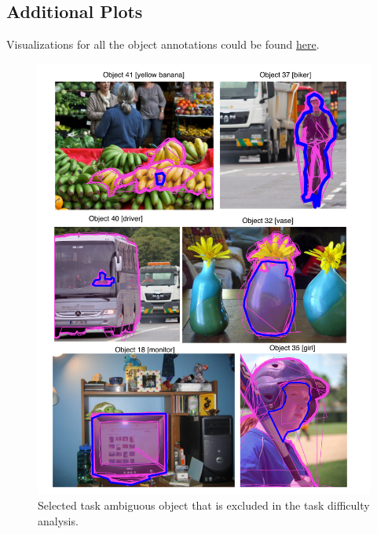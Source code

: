 \documentclass[12pt]{article}
\begin{document}
\begin{appendices}
\section{Additional Plots}
Visualizations for all the object annotations could be found \href{http://nbviewer.jupyter.org/github/dorisjlee/crowd-seg/blob/master/analysis/2017_01_16_Visualize_all_bb_results.ipynb}{here}.
\begin{figure}[ht!]
\centering
\includegraphics[width=\linewidth]{plots/task_ambiguous_cases.pdf}
\caption{Selected task ambiguous object that is excluded in the task difficulty analysis. }
\end{figure}
\begin{figure}[ht!]
\centering
{}

\end{figure}
\end{appendices}
\end{document}
